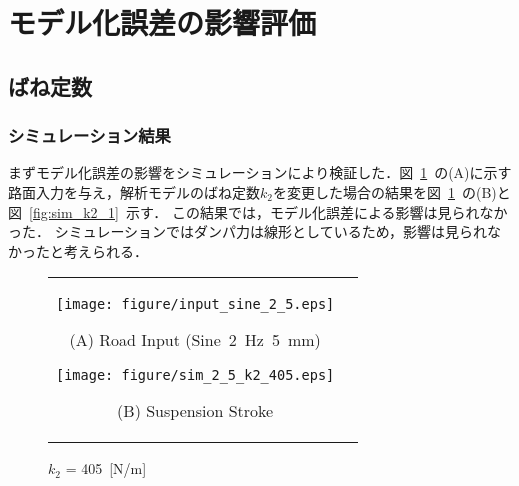 \documentclass[a4paper,12pt]{article_vdlab_sotsuron}
\begin{document}
\newpage
\section{モデル化誤差の影響評価}
\subsection{ばね定数}
\subsubsection{シミュレーション結果}
まずモデル化誤差の影響をシミュレーションにより検証した．図~\ref{fig:sim_k2}~の(A)に示す路面入力を与え，解析モデルのばね定数$k_2$を変更した場合の結果を図~\ref{fig:sim_k2}~の(B)と図~\ref{fig:sim_k2_1}~示す．
この結果では，モデル化誤差による影響は見られなかった．
シミュレーションではダンパ力は線形としているため，影響は見られなかったと考えられる．

\vspace{15mm}
\begin{figure}[h]
    \begin{tabular}{cc}
      \begin{minipage}{0.45\hsize}
	\centering
	  \texttt{[image: figure/input\_sine\_2\_5.eps]}
	  \begin{center}
	  \vspace{2mm}
	  \ (A) Road Input (Sine~2~Hz~5~mm)\
	  \end{center}
	\end{minipage}
       \begin{minipage}{0.5\hsize}
	\centering
	  \texttt{[image: figure/sim\_2\_5\_k2\_405.eps]}
	  \begin{center}
	  \vspace{2mm}
	  \ (B) Suspension Stroke\
	  \end{center}
      \end{minipage}
    \end{tabular}
    \vspace{2mm}
    \caption{$k_2$ = 405~[N/m]}
    \label{fig:sim_k2}
\end{figure}
\end{document}
